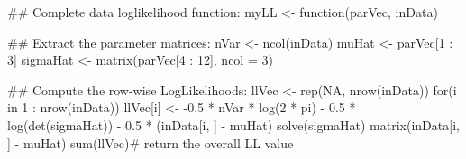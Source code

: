 \begin{Schunk}
\begin{Sinput}
 ## Complete data loglikelihood function:
 myLL <- function(parVec, inData)
 {
     ## Extract the parameter matrices:
     nVar <- ncol(inData)
     muHat <- parVec[1 : 3]
     sigmaHat <- matrix(parVec[4 : 12], ncol = 3)
 
     ## Compute the row-wise LogLikelihoods:
     llVec <- rep(NA, nrow(inData))
     for(i in 1 : nrow(inData)) {
         llVec[i] <- -0.5 * nVar * log(2 * pi) -
             0.5 * log(det(sigmaHat)) -
                 0.5 * (inData[i, ] - muHat) %*%
                     solve(sigmaHat) %*%
                         matrix(inData[i, ] - muHat)
     }
     sum(llVec)# return the overall LL value
 }
\end{Sinput}
\end{Schunk}

